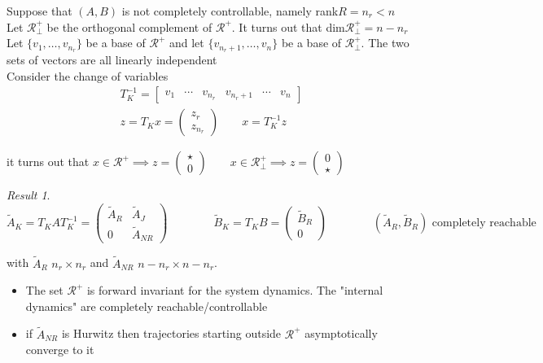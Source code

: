 \documentclass{book}
\theoremstyle{definition}
\theoremstyle{remark}
\theoremstyle{remark}
\newtheorem*{result}{Result}
\begin{document}
Suppose that $(A,B)$ is not completely controllable, namely rank$R=n_r<n$\\
Let $\mathcal{R}^+_{\perp}$ be the orthogonal complement of $\mathcal{R}^+$. It turns out that dim$\mathcal{R}^+_{\perp}=n-n_r$ \\
Let $\{v_1,\dots,v_{n_r}\}$ be a base of $\mathcal{R}^+$ and let $\{v_{n_r+1},\dots,v_n\}$ be a base of $\mathcal{R}^+_{\perp}$. The two sets of vectors are all linearly independent\\
Consider the change of variables \begin{gather*}
    T_K^{-1}=\begin{bmatrix}
    v_1 &  \cdots & v_{n_r} & v_{n_r+1} & \cdots & v_n
\end{bmatrix}\\
z=T_Kx=\begin{pmatrix}
    z_r \\ z_{n_r}
\end{pmatrix} \qquad x=T_K^{-1}z
\end{gather*}

it turns out that $x\in \mathcal{R}^+ \implies z= \begin{pmatrix}
    \star \\ 0
\end{pmatrix} \qquad x\in\mathcal{R}^+_{\perp} \implies z= \begin{pmatrix}
    0 \\ \star
\end{pmatrix}$ 
\begin{result}
\[
    \tilde{A}_K=T_KAT_K^{-1}=\begin{pmatrix}
        \tilde{A}_R & \tilde{A}_J\\
        0 & \tilde{A}_{NR}
    \end{pmatrix} \qquad \qquad \tilde{B}_K=T_KB=\begin{pmatrix}
        \tilde{B}_R \\ 0
    \end{pmatrix} \qquad \qquad (\tilde{A}_R,\tilde{B}_R) \text{ completely reachable}
\]
\end{result}
with  $\tilde{A}_R$ $n_r\times n_r$ and $\tilde{A}_{NR}$ $n-n_r \times n-n_r$.\\
\begin{itemize}
    \item The set $\mathcal{R}^+$ is forward invariant for the system dynamics. The "internal dynamics" are completely reachable/controllable
    \item if $\tilde{A}_{NR}$ is Hurwitz then trajectories starting outside $\mathcal{R}^+$ asymptotically converge to it
\end{itemize}
\end{document}
